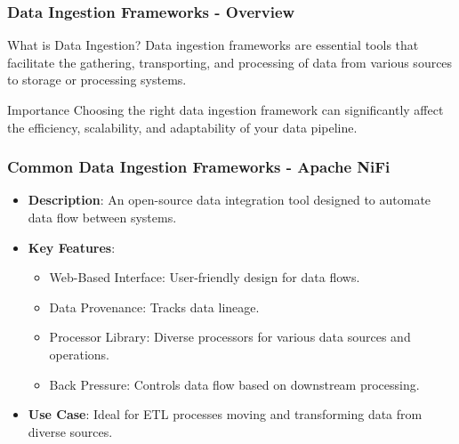 \documentclass{beamer}
\begin{document}
\begin{frame}[fragile]
    \frametitle{Data Ingestion Frameworks - Overview}
    \begin{block}{What is Data Ingestion?}
        Data ingestion frameworks are essential tools that facilitate the gathering, transporting, and processing of data from various sources to storage or processing systems.
    \end{block}
    \begin{block}{Importance}
        Choosing the right data ingestion framework can significantly affect the efficiency, scalability, and adaptability of your data pipeline.
    \end{block}
\end{frame}

\begin{frame}[fragile]
    \frametitle{Common Data Ingestion Frameworks - Apache NiFi}
    \begin{itemize}
        \item \textbf{Description}: An open-source data integration tool designed to automate data flow between systems.
        \item \textbf{Key Features}:
        \begin{itemize}
            \item Web-Based Interface: User-friendly design for data flows.
            \item Data Provenance: Tracks data lineage.
            \item Processor Library: Diverse processors for various data sources and operations.
            \item Back Pressure: Controls data flow based on downstream processing.
        \end{itemize}
        \item \textbf{Use Case}: Ideal for ETL processes moving and transforming data from diverse sources.
    \end{itemize}
\end{frame}
\end{document}
